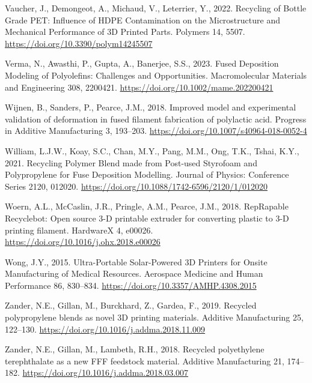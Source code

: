 \documentclass[
  12pt,
  number,
  review]{elsarticle}
\newlength{\cslhangindent}
\newlength{\cslentryspacingunit} %
\newenvironment{CSLReferences}[2] %
 {%
  \setlength{\parindent}{0pt}
  \ifodd #1
  \let\oldpar\par
  \def\par{\hangindent=\cslhangindent\oldpar}
  \fi
  \setlength{\parskip}{#2\cslentryspacingunit}
 }%
 {}
\begin{document}
\begin{CSLReferences}{1}{0}
\leavevmode{}%
Vaucher, J., Demongeot, A., Michaud, V., Leterrier, Y., 2022. Recycling
of {Bottle Grade PET}: {Influence} of {HDPE Contamination} on the
{Microstructure} and {Mechanical Performance} of {3D Printed Parts}.
Polymers 14, 5507. \url{https://doi.org/10.3390/polym14245507}

\leavevmode{}%
Verma, N., Awasthi, P., Gupta, A., Banerjee, S.S., 2023. Fused
{Deposition Modeling} of {Polyolefins}: {Challenges} and
{Opportunities}. Macromolecular Materials and Engineering 308, 2200421.
\url{https://doi.org/10.1002/mame.202200421}

\leavevmode{}%
Wijnen, B., Sanders, P., Pearce, J.M., 2018. Improved model and
experimental validation of deformation in fused filament fabrication of
polylactic acid. Progress in Additive Manufacturing 3, 193--203.
\url{https://doi.org/10.1007/s40964-018-0052-4}

\leavevmode{}%
William, L.J.W., Koay, S.C., Chan, M.Y., Pang, M.M., Ong, T.K., Tshai,
K.Y., 2021. Recycling {Polymer Blend} made from {Post-used Styrofoam}
and {Polypropylene} for {Fuse Deposition Modelling}. Journal of Physics:
Conference Series 2120, 012020.
\url{https://doi.org/10.1088/1742-6596/2120/1/012020}

\leavevmode{}%
Woern, A.L., McCaslin, J.R., Pringle, A.M., Pearce, J.M., 2018.
{RepRapable Recyclebot}: {Open} source 3-{D} printable extruder for
converting plastic to 3-{D} printing filament. HardwareX 4, e00026.
\url{https://doi.org/10.1016/j.ohx.2018.e00026}

\leavevmode{}%
Wong, J.Y., 2015. Ultra-{Portable Solar-Powered 3D Printers} for {Onsite
Manufacturing} of {Medical Resources}. Aerospace Medicine and Human
Performance 86, 830--834. \url{https://doi.org/10.3357/AMHP.4308.2015}

\leavevmode{}%
Zander, N.E., Gillan, M., Burckhard, Z., Gardea, F., 2019. Recycled
polypropylene blends as novel {3D} printing materials. Additive
Manufacturing 25, 122--130.
\url{https://doi.org/10.1016/j.addma.2018.11.009}

\leavevmode{}%
Zander, N.E., Gillan, M., Lambeth, R.H., 2018. Recycled polyethylene
terephthalate as a new {FFF} feedstock material. Additive Manufacturing
21, 174--182. \url{https://doi.org/10.1016/j.addma.2018.03.007}


\end{CSLReferences}
\end{document}
